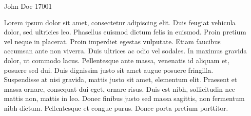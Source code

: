 \documentclass[a4paper,11pt]{article}
\begin{document}
								{John Doe}      						           		%
								{17001}																		%

\begin{mlsolution}

Lorem ipsum dolor sit amet, consectetur adipiscing elit. Duis feugiat vehicula dolor, sed ultricies leo. Phasellus euismod dictum felis in euismod. Proin pretium vel neque in placerat. Proin imperdiet egestas vulputate. Etiam faucibus accumsan ante non viverra. Duis ultrices ac odio vel sodales. In maximus gravida dolor, ut commodo lacus. Pellentesque ante massa, venenatis id aliquam et, posuere sed dui. Duis dignissim justo sit amet augue posuere fringilla. Suspendisse at nisi gravida, mattis justo sit amet, elementum elit. Praesent et massa ornare, consequat dui eget, ornare risus. Duis est nibh, sollicitudin nec mattis non, mattis in leo. Donec finibus justo sed massa sagittis, non fermentum nibh dictum. Pellentesque et congue purus. Donec porta pretium porttitor.


\end{mlsolution}
\end{document}
